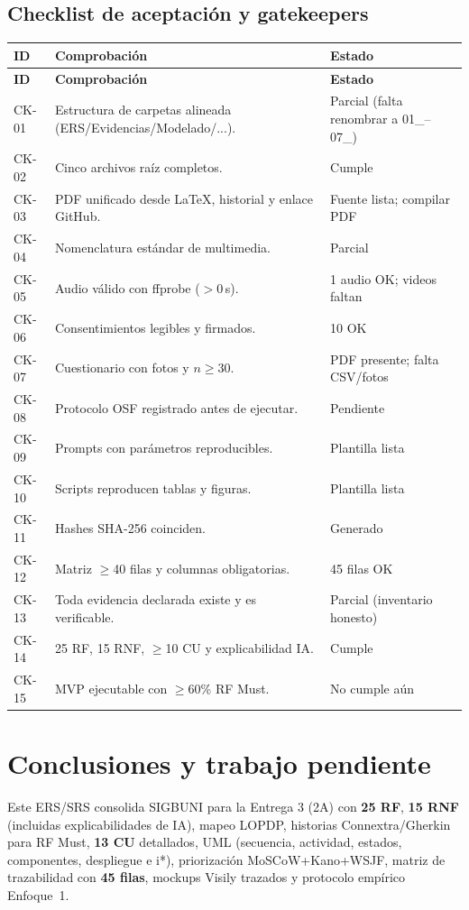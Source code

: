 \documentclass[12pt,journal,onecolumn]{IEEEtran}
\begin{document}
\subsection{Checklist de aceptación y gatekeepers}
\begin{longtable}{P{0.06\textwidth}P{0.78\textwidth}P{0.10\textwidth}}\toprule
\textbf{ID} & \textbf{Comprobación} & \textbf{Estado}\\\midrule\endfirsthead
\toprule\textbf{ID} & \textbf{Comprobación} & \textbf{Estado}\\\midrule\endhead
CK-01 & Estructura de carpetas alineada (ERS/Evidencias/Modelado/...). & Parcial (falta renombrar a 01\_--07\_)\\
CK-02 & Cinco archivos raíz completos. & Cumple\\
CK-03 & PDF unificado desde LaTeX, historial y enlace GitHub. & Fuente lista; compilar PDF\\
CK-04 & Nomenclatura estándar de multimedia. & Parcial\\
CK-05 & Audio válido con ffprobe ($>$0\,s). & 1 audio OK; videos faltan\\
CK-06 & Consentimientos legibles y firmados. & 10 OK\\
CK-07 & Cuestionario con fotos y $n\geq30$. & PDF presente; falta CSV/fotos\\
CK-08 & Protocolo OSF registrado antes de ejecutar. & Pendiente\\
CK-09 & Prompts con parámetros reproducibles. & Plantilla lista\\
CK-10 & Scripts reproducen tablas y figuras. & Plantilla lista\\
CK-11 & Hashes SHA-256 coinciden. & Generado\\
CK-12 & Matriz $\geq$40 filas y columnas obligatorias. & 45 filas OK\\
CK-13 & Toda evidencia declarada existe y es verificable. & Parcial (inventario honesto)\\
CK-14 & 25 RF, 15 RNF, $\geq$10 CU y explicabilidad IA. & Cumple\\
CK-15 & MVP ejecutable con $\geq$60\% RF Must. & No cumple aún\\\bottomrule
\end{longtable}

\section{Conclusiones y trabajo pendiente}
Este ERS/SRS consolida SIGBUNI para la Entrega 3 (2A) con \textbf{25 RF}, \textbf{15 RNF} (incluidas explicabilidades de IA), mapeo LOPDP, historias Connextra/Gherkin para RF Must, \textbf{13 CU} detallados, UML (secuencia, actividad, estados, componentes, despliegue e i*), priorización MoSCoW+Kano+WSJF, matriz de trazabilidad con \textbf{45 filas}, mockups Visily trazados y protocolo empírico Enfoque~1.
\end{document}
